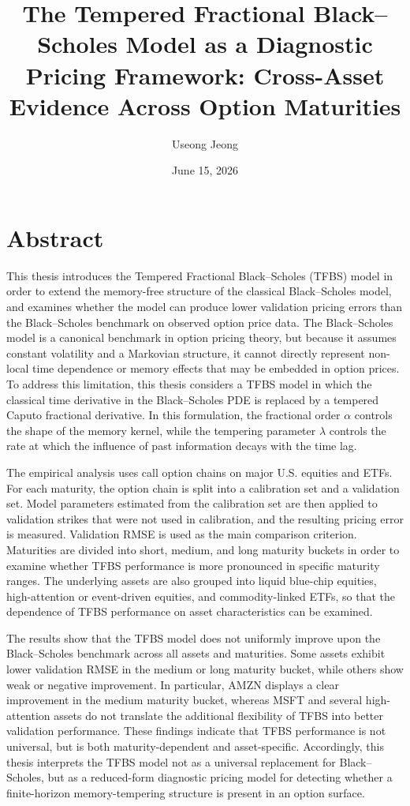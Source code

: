 \documentclass[11pt,a4paper]{report}
\title{The Tempered Fractional Black--Scholes Model as a Diagnostic Pricing Framework: Cross-Asset Evidence Across Option Maturities}
\author{Useong Jeong}
\date{June 15, 2026}
\begin{document}
\maketitle
\newpage

\chapter*{Abstract}

This thesis introduces the Tempered Fractional Black--Scholes (TFBS) model in order to extend the memory-free structure of the classical Black--Scholes model, and examines whether the model can produce lower validation pricing errors than the Black--Scholes benchmark on observed option price data. The Black--Scholes model is a canonical benchmark in option pricing theory, but because it assumes constant volatility and a Markovian structure, it cannot directly represent non-local time dependence or memory effects that may be embedded in option prices. To address this limitation, this thesis considers a TFBS model in which the classical time derivative in the Black--Scholes PDE is replaced by a tempered Caputo fractional derivative. In this formulation, the fractional order $\alpha$ controls the shape of the memory kernel, while the tempering parameter $\lambda$ controls the rate at which the influence of past information decays with the time lag.

The empirical analysis uses call option chains on major U.S. equities and ETFs. For each maturity, the option chain is split into a calibration set and a validation set. Model parameters estimated from the calibration set are then applied to validation strikes that were not used in calibration, and the resulting pricing error is measured. Validation RMSE is used as the main comparison criterion. Maturities are divided into short, medium, and long maturity buckets in order to examine whether TFBS performance is more pronounced in specific maturity ranges. The underlying assets are also grouped into liquid blue-chip equities, high-attention or event-driven equities, and commodity-linked ETFs, so that the dependence of TFBS performance on asset characteristics can be examined.

The results show that the TFBS model does not uniformly improve upon the Black--Scholes benchmark across all assets and maturities. Some assets exhibit lower validation RMSE in the medium or long maturity bucket, while others show weak or negative improvement. In particular, AMZN displays a clear improvement in the medium maturity bucket, whereas MSFT and several high-attention assets do not translate the additional flexibility of TFBS into better validation performance. These findings indicate that TFBS performance is not universal, but is both maturity-dependent and asset-specific. Accordingly, this thesis interprets the TFBS model not as a universal replacement for Black--Scholes, but as a reduced-form diagnostic pricing model for detecting whether a finite-horizon memory-tempering structure is present in an option surface.
\end{document}
